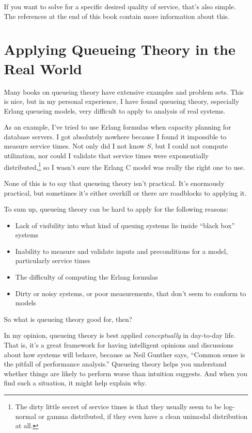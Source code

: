\documentclass{vivid_layout}
\begin{document}
If you want to solve for a specific desired quality of service, that's also
simple. The references at the end of this book contain more information about
this.

\section{Applying Queueing Theory in the Real World}

Many books on queueing theory have extensive examples and problem sets. This is nice, but in my personal experience, I have found queueing theory, especially Erlang queueing models, very difficult to apply to analysis of real systems.

As an example, I've tried to use Erlang formulas when capacity planning for database servers. I got absolutely nowhere because I found it impossible to measure service times. Not only did I not know $S$, but I could not compute utilization, nor could I validate that service times were exponentially distributed,\footnote{The dirty little secret of service times is that they usually seem to be log-normal or gamma distributed, if they even have a clean unimodal distribution at all.} so I wasn't sure the Erlang C model was really the right one to use.

None of this is to say that queueing theory isn't practical. It's enormously practical, but sometimes it's either overkill or there are roadblocks to applying it.

To sum up, queueing theory can be hard to apply for the following reasons:

\begin{itemize}
\item Lack of visibility into what kind of queuing systems lie inside ``black box'' systems
\item Inability to measure and validate inputs and preconditions for a model, particularly service times
\item The difficulty of computing the Erlang formulas
\item Dirty or noisy systems, or poor measurements, that don't seem to conform to models
\end{itemize}

So what is queueing theory good for, then?

In my opinion, queueing theory is best applied {\itshape conceptually} in day-to-day life. That is, it's a great framework for having intelligent opinions and discussions about how systems will behave, because as Neil Gunther says, ``Common sense is the pitfall of performance analysis.'' Queueing theory helps you understand whether things are likely to perform worse than intuition suggests. And when you find such a situation, it might help explain why.
\end{document}

